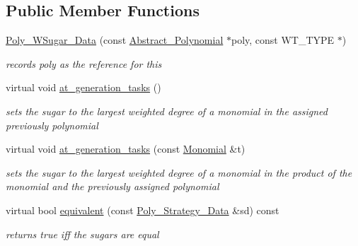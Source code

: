 \subsection*{Public Member Functions}
\begin{DoxyCompactItemize}
\item 
\hyperlink{class_poly___w_sugar___data_a685c420830b3c050866a4675b4c1d749}{Poly\+\_\+\+W\+Sugar\+\_\+\+Data} (const \hyperlink{class_abstract___polynomial}{Abstract\+\_\+\+Polynomial} $\ast$poly, const W\+T\+\_\+\+T\+Y\+PE $\ast$)
\begin{DoxyCompactList}\small\item\em records {\ttfamily poly} as the reference for {\ttfamily this} \end{DoxyCompactList}\item 
\mbox{\label{class_poly___w_sugar___data_ac07ee9ee15bd97e5e8befb3f6cec3929}} 
virtual void \hyperlink{class_poly___w_sugar___data_ac07ee9ee15bd97e5e8befb3f6cec3929}{at\+\_\+generation\+\_\+tasks} ()
\begin{DoxyCompactList}\small\item\em sets the sugar to the largest weighted degree of a monomial in the assigned previously polynomial \end{DoxyCompactList}\item 
\mbox{\label{class_poly___w_sugar___data_ac58bd8d30e7e10dbbe8e86b1d9d04376}} 
virtual void \hyperlink{class_poly___w_sugar___data_ac58bd8d30e7e10dbbe8e86b1d9d04376}{at\+\_\+generation\+\_\+tasks} (const \hyperlink{class_monomial}{Monomial} \&t)
\begin{DoxyCompactList}\small\item\em sets the sugar to the largest weighted degree of a monomial in the product of the monomial and the previously assigned polynomial \end{DoxyCompactList}\item 
\mbox{\label{class_poly___w_sugar___data_a50b4b29d57fb8bed56174733207369dd}} 
virtual bool \hyperlink{class_poly___w_sugar___data_a50b4b29d57fb8bed56174733207369dd}{equivalent} (const \hyperlink{class_poly___strategy___data}{Poly\+\_\+\+Strategy\+\_\+\+Data} \&sd) const
\begin{DoxyCompactList}\small\item\em returns {\ttfamily true} iff the sugars are equal \end{DoxyCompactList}\item 

\end{DoxyCompactItemize}
